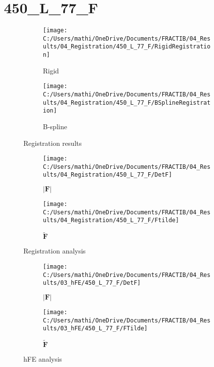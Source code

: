 \documentclass{article}%
\begin{document}
%
\newpage%
\section*{450\_L\_77\_F}%
\label{sec:450L77F}%


\begin{figure}[h!]%
\begin{subfigure}[b]{0.5\linewidth}%
\texttt{[image: C:/Users/mathi/OneDrive/Documents/FRACTIB/04\_Results/04\_Registration/450\_L\_77\_F/RigidRegistration]}%
\caption{Rigid}%
\end{subfigure}%
\begin{subfigure}[b]{0.5\linewidth}%
\texttt{[image: C:/Users/mathi/OneDrive/Documents/FRACTIB/04\_Results/04\_Registration/450\_L\_77\_F/BSplineRegistration]}%
\caption{B{-}spline}%
\end{subfigure}%
\caption{Registration results}%
\end{figure}

%


\begin{figure}[h!]%
\begin{subfigure}[b]{0.5\linewidth}%
\texttt{[image: C:/Users/mathi/OneDrive/Documents/FRACTIB/04\_Results/04\_Registration/450\_L\_77\_F/DetF]}%
\caption{$|\mathbf{F}|$}%
\end{subfigure}%
\begin{subfigure}[b]{0.5\linewidth}%
\texttt{[image: C:/Users/mathi/OneDrive/Documents/FRACTIB/04\_Results/04\_Registration/450\_L\_77\_F/Ftilde]}%
\caption{$\tilde{\mathbf{F}}$}%
\end{subfigure}%
\caption{Registration analysis}%
\end{figure}

%


\begin{figure}[h!]%
\begin{subfigure}[b]{0.5\linewidth}%
\texttt{[image: C:/Users/mathi/OneDrive/Documents/FRACTIB/04\_Results/03\_hFE/450\_L\_77\_F/DetF]}%
\caption{$|\mathbf{F}|$}%
\end{subfigure}%
\begin{subfigure}[b]{0.5\linewidth}%
\texttt{[image: C:/Users/mathi/OneDrive/Documents/FRACTIB/04\_Results/03\_hFE/450\_L\_77\_F/FTilde]}%
\caption{$\tilde{\mathbf{F}}$}%
\end{subfigure}%
\caption{hFE analysis}%
\end{figure}
\end{document}
